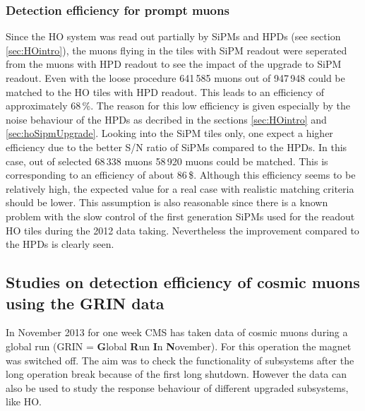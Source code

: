 		\subsubsection{Detection efficiency for prompt muons}
			Since the HO system was read out partially by SiPMs and HPDs (see section \ref{sec:HOintro}), the muons flying in the tiles with SiPM readout were seperated from the muons with HPD readout to see
			the impact of the upgrade to SiPM readout.
			Even with the loose procedure 641\,585 muons out of 947\,948 could be matched to the HO tiles with HPD readout.
			This leads to an efficiency of approximately 68\,\%.
			The reason for this low efficiency is given especially by the noise behaviour of the HPDs as decribed in the sections \ref{sec:HOintro} and \ref{sec:hoSipmUpgrade}.
			Looking into the SiPM tiles only, one expect a higher efficiency due to the better S/N ratio of SiPMs compared to the HPDs.
			In this case, out of selected 68\,338 muons 58\,920 muons could be matched.
			This is corresponding to an efficiency of about 86\,\$.
			Although this efficiency seems to be relatively high, the expected value for a real case with realistic matching criteria should be lower.
			This assumption is also reasonable since there is a known problem with the slow control of the first generation SiPMs used for the readout HO tiles during the 2012 data taking.
			Nevertheless the improvement compared to the HPDs is clearly seen.
	\subsection{Studies on detection efficiency of cosmic muons using the GRIN data} 
		In November 2013 for one week CMS has taken data of cosmic muons during a global run (GRIN = \textbf{G}lobal \textbf{R}un \textbf{I}n \textbf{N}ovember).
		For this operation the magnet was switched off.
		The aim was to check the functionality of subsystems after the long operation break because of the first long shutdown.
		However the data can also be used to study the response behaviour of different upgraded subsystems, like HO.
